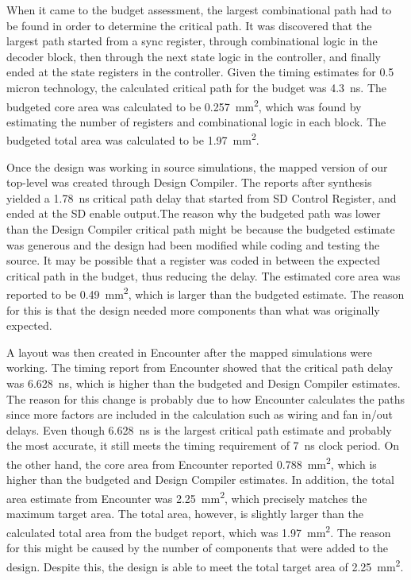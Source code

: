 \documentclass[12pt,letter,oneside]{report}
\begin{document}
When it came to the budget assessment, the largest combinational path had to be found in order to determine the critical path. It was discovered that the largest path started from a sync register, through combinational logic in the decoder block, then through the next state logic in the controller, and finally ended at the state registers in the controller. Given the timing estimates for 0.5 micron technology, the calculated critical path for the budget was \SI{4.3}{\nano\second}. The budgeted core area was calculated to be \SI{0.257}{\milli\meter\squared}, which was found by estimating the number of registers and combinational logic in each block. The budgeted total area was calculated to be \SI{1.97}{\milli\meter\squared}.

Once the design was working in source simulations, the mapped version of our top-level was created through Design Compiler. The reports after synthesis yielded a \SI{1.78}{\nano\second} critical path delay that started from SD Control Register, and ended at the SD enable output.The reason why the budgeted path was lower than the Design Compiler critical path might be because the budgeted estimate was generous and the design had been modified while coding and testing the source. It may be possible that a register was coded in between the expected critical path in the budget, thus reducing the delay. The estimated  core area was reported to be \SI{0.49}{\milli\meter\squared}, which is larger than the budgeted estimate. The reason for this is that the design needed more components than what was originally expected.

A layout was then created in Encounter after the mapped simulations were working. The timing report from Encounter showed that the critical path delay was \SI{6.628}{\nano\second}, which is higher than the budgeted and Design Compiler estimates. The reason for this change is probably due to how Encounter calculates the paths since more factors are included in the calculation such as wiring and fan in/out delays. Even though \SI{6.628}{\nano\second} is the largest critical path estimate and probably the most accurate, it still meets the timing requirement of \SI{7}{\nano\second} clock period. On the other hand, the core area from Encounter reported \SI{0.788}{\milli\meter\squared}, which is higher than the budgeted and Design Compiler estimates. In addition, the total area estimate from Encounter was \SI{2.25}{\milli\meter\squared}, which precisely matches the maximum target area. The total area, however, is slightly larger than the calculated total area from the budget report, which was \SI{1.97}{\milli\meter\squared}. The reason for this might be caused by the number of components that were added to the design. Despite this, the design is able to meet the total target area of \SI{2.25}{\milli\meter\squared}.
\end{document}
